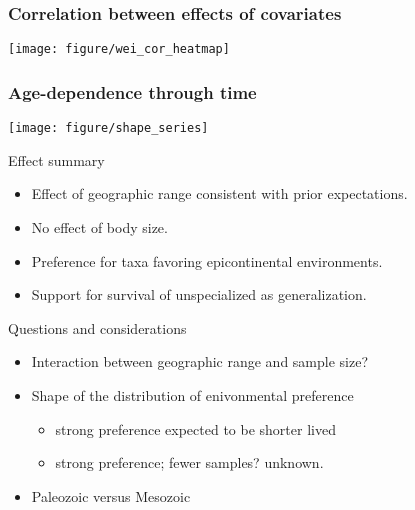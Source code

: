 \documentclass{beamer}
\begin{document}
\begin{frame}
  \frametitle{Correlation between effects of covariates}
  \texttt{[image: figure/wei\_cor\_heatmap]}
\end{frame}

\begin{frame}
  \frametitle{Age-dependence through time}
  \texttt{[image: figure/shape\_series]}
\end{frame}

\begin{frame}
  \begin{block}{Effect summary}
    \begin{itemize}
      \item Effect of geographic range consistent with prior expectations.
      \item No effect of body size.
      \item Preference for taxa favoring epicontinental environments.
      \item Support for survival of unspecialized as generalization.
    \end{itemize}
  \end{block}
\end{frame}

\begin{frame}
  \begin{alertblock}{Questions and considerations}
    \begin{itemize}
      \item Interaction between geographic range and sample size?
      \item Shape of the distribution of enivonmental preference
        \begin{itemize}
          \item strong preference expected to be shorter lived
          \item strong preference; fewer samples? unknown.
        \end{itemize}
      \item Paleozoic versus Mesozoic
    \end{itemize}
  \end{alertblock}
\end{frame}
\end{document}
